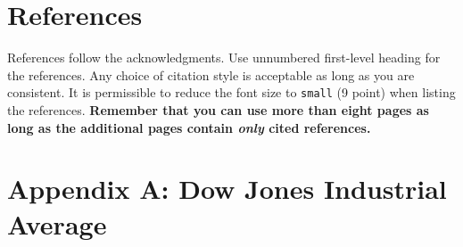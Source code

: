 \documentclass{article}
\begin{document}
\section*{References}

References follow the acknowledgments. Use unnumbered first-level
heading for the references. Any choice of citation style is acceptable
as long as you are consistent. It is permissible to reduce the font
size to \verb+small+ (9 point) when listing the references. {\bf
  Remember that you can use more than eight pages as long as the
  additional pages contain \emph{only} cited references.}
\medskip

\newpage
\section*{Appendix A: Dow Jones Industrial Average}
\end{document}
